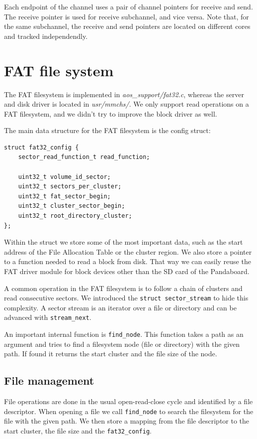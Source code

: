\documentclass[a4paper,10pt]{article}
\newcommand{\filepath}[1]{\emph{ #1}}
\begin{document}
	Each endpoint of the channel uses a pair of channel pointers for receive and send. 
	The receive pointer is used for receive subchannel, and vice versa.
	Note that, for the same subchannel, the receive and send pointers are located on different cores and tracked independendly.
	


\section{FAT file system}

The FAT filesystem is implemented in \filepath{aos\_support/fat32.c}, whereas the server and disk driver is located in \filepath{usr/mmchs/}.
We only support read operations on a FAT filesystem, and we didn't try to improve the block driver as well.

The main data structure for the FAT filesystem is the config struct:

\begin{lstlisting}
struct fat32_config {
    sector_read_function_t read_function;

    uint32_t volume_id_sector;
    uint32_t sectors_per_cluster;
    uint32_t fat_sector_begin;
    uint32_t cluster_sector_begin;
    uint32_t root_directory_cluster;
};
\end{lstlisting}

Within the struct we store some of the most important data, such as the start address of the File Allocation Table or the cluster region.
We also store a pointer to a function needed to read a block from disk.
That way we can easily reuse the FAT driver module for block devices other than the SD card of the Pandaboard.

A common operation in the FAT filesystem is to follow a chain of clusters and read consecutive sectors.
We introduced the \lstinline!struct sector_stream! to hide this complexity.
A sector stream is an iterator over a file or directory and can be advanced with \lstinline!stream_next!.

An important internal function is \lstinline!find_node!.
This function takes a path as an argument and tries to find a filesystem node (file or directory) with the given path.
If found it returns the start cluster and the file size of the node.

\subsection{File management}
File operations are done in the usual open-read-close cycle and identified by a file descriptor.
When opening a file we call \lstinline!find_node! to search the filesystem for the file with the given path.
We then store a mapping from the file descriptor to the start cluster, the file size and the \lstinline!fat32_config!.
\end{document}
